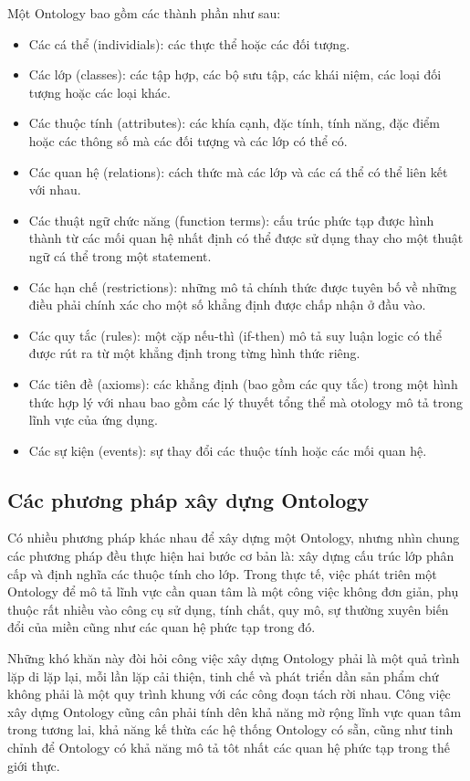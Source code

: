 Một Ontology bao gồm các thành phần như sau:
\begin{itemize}
    \item Các cá thể (individials): các thực thể hoặc các đối tượng.
    \item Các lớp (classes): các tập hợp, các bộ sưu tập, các khái niệm, các loại đối tượng hoặc các loại khác.
    \item Các thuộc tính (attributes): các khía cạnh, đặc tính, tính năng, đặc điểm hoặc các thông số mà các đối tượng và các lớp có thể có.
    \item Các quan hệ (relations): cách thức mà các lớp và các cá thể có thể liên kết với nhau.
    \item Các thuật ngữ chức năng (function terms): cấu trúc phức tạp được hình thành từ các mối quan hệ nhất định có thể được sử dụng thay cho một thuật ngữ cá thể trong một statement.
    \item Các hạn chế (restrictions): những mô tả chính thức được tuyên bố về những điều phải chính xác cho một số khẳng định được chấp nhận ở đầu vào.
    \item Các quy tắc (rules): một cặp nếu-thì (if-then) mô tả suy luận logic có thể được rút ra từ một khẳng định trong từng hình thức riêng.
    \item Các tiên đề (axioms): các khẳng định (bao gồm các quy tắc) trong một hình thức hợp lý với nhau bao gồm các lý thuyết tổng thể mà otology mô tả trong lĩnh vực của ứng dụng.
    \item Các sự kiện (events): sự thay đổi các thuộc tính hoặc các mối quan hệ.
\end{itemize}
    
    \subsection{Các phương pháp xây dựng Ontology}

Có nhiều phương pháp khác nhau để xây dựng một Ontology, nhưng nhìn chung các phương pháp đều thực hiện hai bước cơ bản là: xây dựng cấu trúc lớp phân cấp và định nghĩa các thuộc tính cho lớp. Trong thực tế, việc phát triên một Ontology để mô tả lĩnh vực cần quan tâm là một công việc không đơn giản, phụ thuộc rất nhiều vào công cụ sử dụng, tính chất, quy mô, sự thường xuyên biến đổi của miền cũng như các quan hệ phức tạp trong đó. 

Những khó khăn này đòi hỏi công việc xây dựng Ontology phải là một quả trình lặp di lặp lại, mỗi lần lặp cải thiện, tinh chế và phát triển dần sản phẩm chứ không phải là một quy trình khung với các công đoạn tách rời nhau. Công việc xây dựng Ontology cũng cân phải tính dên khả năng mờ rộng lĩnh vực quan tâm trong tương lai, khả năng kế thừa các hệ thống Ontology có sẵn, cũng như tinh chỉnh để Ontology có khả năng mô tả tôt nhất các quan hệ phức tạp trong thế giới thực.

